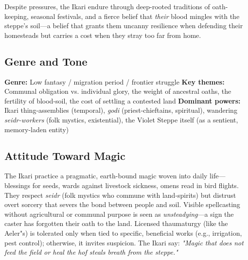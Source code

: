 \documentclass[12pt]{article}
\begin{document}
Despite pressures, the Ikari endure through deep-rooted traditions of oath-keeping, seasonal festivals, and a fierce belief that \textit{their} blood mingles with the steppe's soil---a belief that grants them uncanny resilience when defending their homesteads but carries a cost when they stray too far from home.

\subsection{Genre and Tone}
\textbf{Genre:} Low fantasy / migration period / frontier struggle  
\textbf{Key themes:} Communal obligation vs. individual glory, the weight of ancestral oaths, the fertility of blood-soil, the cost of settling a contested land  
\textbf{Dominant powers:} Ikari thing-assemblies (temporal), \textit{godi} (priest-chieftains, spiritual), wandering \textit{seidr-workers} (folk mystics, existential), the Violet Steppe itself (as a sentient, memory-laden entity)

\subsection{Attitude Toward Magic}
The Ikari practice a pragmatic, earth-bound magic woven into daily life---blessings for seeds, wards against livestock sickness, omens read in bird flights. They respect \textit{seidr} (folk mystics who commune with land-spirits) but distrust overt sorcery that severs the bond between people and soil. Visible spellcasting without agricultural or communal purpose is seen as \textit{unsteadying}---a sign the caster has forgotten their oath to the land. Licensed thaumaturgy (like the Aeler"s) is tolerated only when tied to specific, beneficial works (e.g., irrigation, pest control); otherwise, it invites suspicion. The Ikari say: \textit{"Magic that does not feed the field or heal the hof steals breath from the steppe."}
\end{document}
